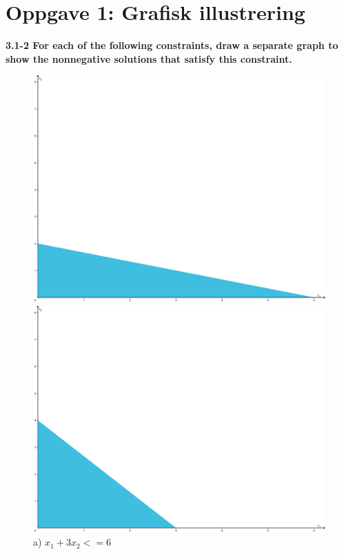 \documentclass{article}
\begin{document}
    
    
    \captionsetup[figure]{labelformat=empty}


    \section*{\textbf{Oppgave 1: Grafisk illustrering}}
    \small\textbf{3.1-2 For each of the following constraints, draw a separate graph to show the nonnegative solutions that satisfy this constraint.}
    
    \begin{figure}[ht]
        \centering
        \begin{minipage}{0.3\textwidth}
            \centering
            \includegraphics[width=\linewidth]{img/3.1-2a.PNG}
            \caption{a) $x_1 + 3x_2 <= 6$}
        \end{minipage}\hfill
        \begin{minipage}{0.3\textwidth}
            \centering
            \includegraphics[width=\linewidth]{img/3.1-2b.PNG}

\end{minipage}
\end{figure}
\end{document}
